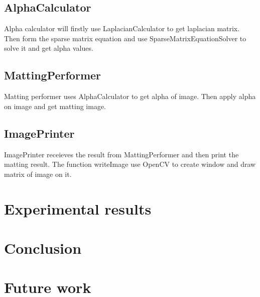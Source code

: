 \documentclass[11pt,letterpaper]{article}
\begin{document}
\subsection{AlphaCalculator}
Alpha calculator will firstly use LaplacianCalculator to get laplacian matrix. Then form the sparse matrix equation and use SparseMatrixEquationSolver to solve it and get alpha values.

\subsection{MattingPerformer}
Matting performer uses AlphaCalculator to get alpha of image. Then apply alpha on image and get matting image.

\subsection{ImagePrinter}
ImagePrinter receieves the result from MattingPerformer and then print the matting result. The function writeImage use OpenCV to create window and draw matrix of image on it. 

\section{Experimental results}
\section{Conclusion}
\section{Future work}


\end{document}
